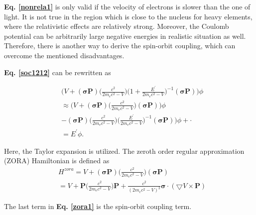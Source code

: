 \documentclass[a4paper, 12pt, titlepage,oneside,drop]{kthesis}
\begin{document}
\textbf{Eq. \ref{nonrela1}} is only valid if the velocity of electrons is slower than the one of light. It is not true in the region which is close to the nucleus for heavy elements, where the relativistic effects
are relatively strong. Moreover, the Coulomb potential can be arbitrarily large negative energies in realistic situation as well. Therefore, there is another way to derive 
the spin-orbit coupling, which can overcome the mentioned disadvantages.

\textbf{Eq. \ref{soc1212}} can be rewritten as

\begin{equation}\begin{split}\label{soc001}
& \Big(V + (\boldsymbol{\sigma} \textbf{P}) \Big(\frac{c^2}{2m_ec^2-V}\Big)\Big(1+\frac{E^{\prime}}{2m_ec^2-V}\Big)^{-1} (\boldsymbol{\sigma} \textbf{P}) \Big)\phi \\
& \approx \Big( V + (\boldsymbol{\sigma} \textbf{P}) \Big(\frac{c^2}{2m_ec^2-V}\Big)(\boldsymbol{\sigma} \textbf{P}) \Big)\phi \\
& - (\boldsymbol{\sigma} \textbf{P}) \Big(\frac{c^2}{2m_ec^2-V}\Big)\Big(\frac{E^{\prime}}{2m_ec^2-V}\Big)^{-1} (\boldsymbol{\sigma} \textbf{P}) \Big)\phi + \cdot \\
& =E^{\prime}\phi.
\end{split}
\end{equation}

Here, the Taylor expansion is utilized. The zeroth order regular approximation (ZORA) Hamiltonian \cite{van1994relativistic, faas1995zora, van1996zero} is defined as
\begin{equation}\begin{split}\label{zora1}
& H^{zora} = V + (\boldsymbol{\sigma} \textbf{P}) \Big(\frac{c^2}{2m_ec^2-V}\Big)(\boldsymbol{\sigma} \textbf{P}) \\
& =  V + \textbf{P} \Big(\frac{c^2}{2m_ec^2-V}\Big)\textbf{P} + \frac{c^2}{(2m_ec^2-V)^2} \boldsymbol{\sigma}\cdot(\bigtriangledown V\times \textbf{P})
 \end{split}
\end{equation}

The last term in \textbf{Eq. \ref{zora1}} is the spin-orbit coupling term.
\end{document}
